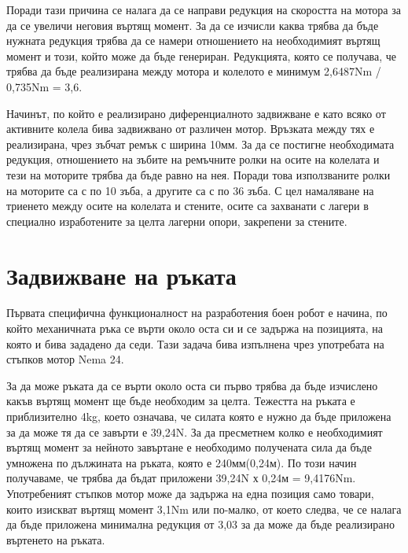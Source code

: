 Поради тази причина се налага да се направи редукция на скоростта на мотора за да се увеличи неговия въртящ момент. За да се изчисли каква трябва да бъде нужната редукция трябва да се намери отношението на необходимият въртящ момент и този, който може да бъде генериран. Редукцията, която се получава, че трябва да бъде реализирана между мотора и колелото е минимум 2,6487Nm / 0,735Nm = 3,6.

Начинът, по който е реализирано диференциалното задвижване е като всяко от активните колела бива задвижвано от различен мотор. Връзката между тях е реализирана, чрез зъбчат ремък с ширина 10мм. За да се постигне необходимата редукция, отношението на зъбите на ремъчните ролки на осите на колелата и тези на моторите трябва да бъде равно на нея. Поради това използваните ролки на моторите са с по 10 зъба, а другите са с по 36 зъба. С цел намаляване на триенето между осите на колелата и стените, осите са захванати с лагери в специално изработените за целта лагерни опори, закрепени за стените.


\section{Задвижване на ръката}

Първата специфична функционалност на разработения боен робот е начина, по който механичната ръка се върти около оста си и се задържа на позицията, на която и бива зададено да седи. Тази задача бива изпълнена чрез употребата на стъпков мотор Nema 24.

За да може ръката да се върти около оста си първо трябва да бъде изчислено какъв въртящ момент ще бъде необходим за целта. Тежестта на ръката е приблизително 4kg, което означава, че силата която е нужно да бъде приложена за да може тя да се завърти е 39,24N. За да пресметнем колко е необходимият въртящ момент за нейното завъртане е необходимо получената сила да бъде умножена по дължината на ръката, която е 240мм(0,24м). По този начин получаваме, че трябва да бъдат приложени 39,24N х 0,24м = 9,4176Nm. Употребеният стъпков мотор може да задържа на една позиция само товари, които изискват въртящ момент 3,1Nm или по-малко, от което следва, че се налага да бъде приложена минимална редукция от 3,03 за да може да бъде реализирано въртенето на ръката.

